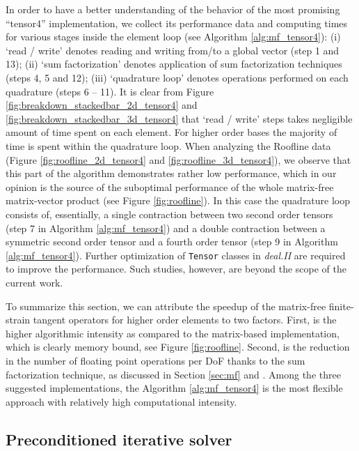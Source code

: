\documentclass[times,doublespace]{nmeauth}
\begin{document}
{In order to have a better understanding of the behavior of the most promising ``tensor4'' implementation,
we collect its performance data and computing times for various stages inside the element loop (see Algorithm \ref{alg:mf_tensor4}):
(i) `read / write' denotes reading and writing from/to a global vector (step 1 and 13);
(ii) `sum factorization' denotes application of sum factorization techniques (steps 4, 5 and 12);
(iii) `quadrature loop' denotes operations performed on each quadrature (steps 6 -- 11).
It is clear from Figure \ref{fig:breakdown_stackedbar_2d_tensor4} and  \ref{fig:breakdown_stackedbar_3d_tensor4} that
`read / write' steps takes negligible amount of time spent on each element.
For higher order bases the majority of time is spent within the quadrature loop.
When analyzing the Roofline data (Figure \ref{fig:roofline_2d_tensor4} and \ref{fig:roofline_3d_tensor4}),
we observe that this part of the algorithm demonstrates rather low performance, which in our opinion is the source of the
suboptimal performance of the whole matrix-free matrix-vector product (see Figure \ref{fig:roofline}).
In this case the quadrature loop consists of, essentially, a
single contraction between two second order tensors (step 7 in Algorithm \ref{alg:mf_tensor4}) and a
double contraction between a symmetric second order tensor and a fourth order tensor (step 9 in Algorithm \ref{alg:mf_tensor4}).
Further optimization of \texttt{Tensor} classes in \textit{deal.II} are required to
improve the performance.
Such studies, however, are beyond the scope of the current work.
}

{\color{red}
To summarize this section, we can attribute the speedup of the matrix-free finite-strain tangent operators for higher order elements to two factors.
First, is the higher algorithmic intensity as compared to the matrix-based implementation, which is clearly memory
bound, see Figure \ref{fig:roofline}.
Second, is the reduction in the number of floating point operations per DoF thanks to the sum factorization technique, as discussed in
Section \ref{sec:mf} and \cite[Section 2.4]{kronbichler12}.
Among the three suggested implementations, the Algorithm \ref{alg:mf_tensor4} is the most flexible approach with relatively high computational intensity.
}

\subsection{Preconditioned iterative solver}
\end{document}
